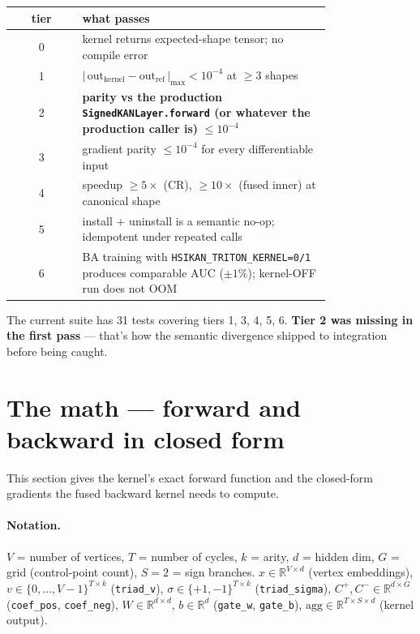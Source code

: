 \documentclass[11pt,a4paper]{article}
\begin{document}
\begin{center}
\begin{tabular}{c p{0.78\linewidth}}
\toprule
\textbf{tier} & \textbf{what passes} \\
\midrule
0  & kernel returns expected-shape tensor; no compile error \\
1  & $|\,\text{out}_\text{kernel} - \text{out}_\text{ref}\,|_{\max} < 10^{-4}$ at $\ge 3$ shapes \\
2  & \textbf{parity vs the production \texttt{SignedKANLayer.forward} (or whatever the production caller is)} $\le 10^{-4}$ \\
3  & gradient parity $\le 10^{-4}$ for every differentiable input \\
4  & speedup $\ge 5\times$ (CR), $\ge 10\times$ (fused inner) at canonical shape \\
5  & install + uninstall is a semantic no-op; idempotent under repeated calls \\
6  & BA training with \texttt{HSIKAN\_TRITON\_KERNEL=0/1} produces comparable AUC ($\pm 1\%$); kernel-OFF run does not OOM \\
\bottomrule
\end{tabular}
\end{center}

The current suite has 31 tests covering tiers 1, 3, 4, 5, 6. \textbf{Tier 2 was missing in the first pass} --- that's how the semantic divergence shipped to integration before being caught.

\section{The math — forward and backward in closed form}

This section gives the kernel's exact forward function and the closed-form gradients the fused backward kernel needs to compute.

\paragraph{Notation.}
$V$ = number of vertices, $T$ = number of cycles, $k$ = arity, $d$ = hidden dim, $G$ = grid (control-point count), $S=2$ = sign branches.
$x \in \mathbb{R}^{V\times d}$ (vertex embeddings),
$v \in \{0,\dots,V-1\}^{T\times k}$ (\texttt{triad\_v}),
$\sigma \in \{+1,-1\}^{T\times k}$ (\texttt{triad\_sigma}),
$C^{+}, C^{-} \in \mathbb{R}^{d\times G}$ (\texttt{coef\_pos}, \texttt{coef\_neg}),
$W \in \mathbb{R}^{d\times d}$, $b \in \mathbb{R}^{d}$ (\texttt{gate\_w}, \texttt{gate\_b}),
$\mathrm{agg} \in \mathbb{R}^{T\times S\times d}$ (kernel output).
\end{document}
